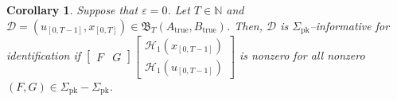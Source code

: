 \documentclass[journal,twoside,web]{ieeecolor}
\newtheorem{corollary}[theorem]{Corollary}
\begin{document}
\begin{corollary}
\label{cor:inf_noise-free_general}
Suppose that $\varepsilon=0$. Let $T\in\mathbb{N}$ and  \linebreak $\mathcal{D}=(u_{[0,T-1]},x_{[0,T]})\in\mathfrak{B}_T(A_\text{true},B_\text{true})$. Then,  $\mathcal{D}$ is \mbox{$\Sigma_\text{pk}$--informative} for identification if $\begin{bmatrix}
F & G
\end{bmatrix}\begin{bmatrix}
\mathcal{H}_1(x_{[0,T-1]}) \\
\mathcal{H}_1(u_{[0,T-1]})
\end{bmatrix}$ is nonzero for all nonzero $(F,G)\in\Sigma_\text{pk}-\Sigma_\text{pk}$.
\end{corollary}\vspace{0.25 cm}
\end{document}
